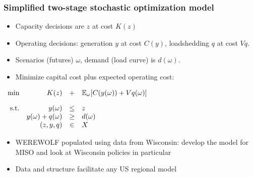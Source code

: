 \documentclass[xcolor=dvipsnames]{beamer}
\newcommand{\expect}{\mathbb{E}}
\begin{document}
\begin{frame}
\frametitle{Simplified two-stage stochastic optimization model}
\begin{itemize}
\item Capacity decisions are $z$ at cost $K(z)$
\item Operating decisions: generation $y$ at cost $C(y)$,
loadshedding $q$ at cost $Vq$.
\item Scenarios (futures) $\omega$, demand (load curve) is $d(\omega)$.
\item Minimize capital cost plus expected operating cost:
\end{itemize}
\begin{center}
$%
\begin{array}{rrcl}
\min & \quad K(z)  & + & \expect_{\omega }[%
C(y(\omega )) + Vq(\omega)] \\[1em]
\text{s.t.} & \quad
\textcolor{black}{y(\omega)} & \textcolor{black}{\leq} & %
\textcolor{black}{z} \\
& \textcolor{black}{y(\omega) + q(\omega)} & \textcolor{black}{\geq} & %
                                                                       \textcolor{black}{d(\omega)}
  \\
& (z, y, q) & \in & X
\end{array}%
$
\end{center}
\begin{itemize}
\item WEREWOLF populated using data from Wisconsin: develop the model
  for MISO and look at Wisconsin policies in particular
\item Data and structure facilitate any US regional model
\end{itemize}
\end{frame}
\end{document}
